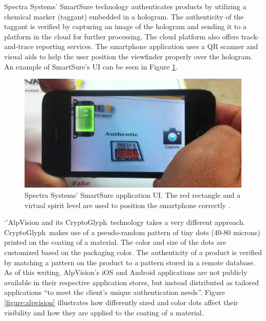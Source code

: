 \documentclass[thesis.tex]{subfiles}
\begin{document}
Spectra Systems' SmartSure technology authenticates products by utilizing a chemical marker (taggant) embedded in a hologram. The authenticity of the taggant is verified by capturing an image of the hologram and sending it to a platform in the cloud for further processing. The cloud platform also offers track-and-trace reporting services. The smartphone application uses a QR scanner and visual aids to help the user position the viewfinder properly over the hologram. \cite{inksure} An example of SmartSure's UI can be seen in Figure \ref{figure:inksure}.

\begin{figure}[ht]
\centering \includegraphics[width=13.25cm]{images/existing_solutions/smartsure}
\vspace{-4mm}
\caption{Spectra Systems' SmartSure application UI. The red rectangle and a virtual spirit level are used to position the smartphone correctly \cite{inksure}. \label{figure:inksure}}
\end{figure}
\enlargethispage{1\baselineskip}

`'AlpVision and its CryptoGlyph\textregistered\ technology takes a very different approach. CryptoGlyph\textregistered\ makes use of a pseudo-random pattern of tiny dots (40-80 microns) printed on the coating of a material. The color and size of the dots are customized based on the packaging color. The authenticity of a product is verified by matching a pattern on the product to a pattern stored in a remote database. As of this writing, AlpVision's iOS and Android applications are not publicly available in their respective application stores, but instead distributed as tailored applications ``to meet the client's unique authentication needs''. Figure \ref{figure:alpvision} illustrates how differently sized and color dots affect their visibility and how they are applied to the coating of a material. \cite{alpvision}
\end{document}
